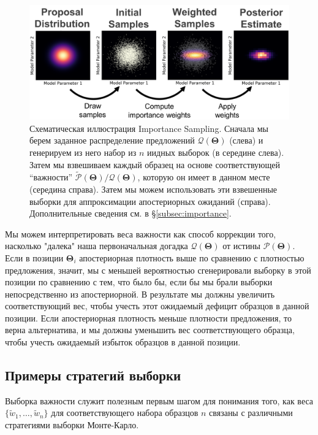 \documentclass[12pt, titlepage]{article}
\newcommand{\params}{\ensuremath{\boldsymbol\Theta}}
\newcommand{\posterior}{\ensuremath{\mathcal{P}}}
\newcommand{\proposal}{\ensuremath{\mathcal{Q}}}
\begin{document}
\begin{figure}
\begin{center}
\includegraphics[width=\textwidth]{figures/fig7.png}
\end{center}
\caption{Схематическая иллюстрация Importance Sampling. Сначала мы берем заданное распределение предложений $\proposal(\params)$ (слева) и генерируем из него набор из $n$ иидных выборок (в середине слева). Затем мы взвешиваем каждый образец на основе соответствующей ``важности'' $\tilde{\posterior}(\params)/\proposal(\params)$, которую он имеет в данном месте (середина справа). Затем мы можем использовать эти взвешенные выборки для аппроксимации апостериорных ожиданий (справа). Дополнительные сведения см. в \S\ref{subsec:importance}.
}\label{fig:importance}
\end{figure}

Мы можем интерпретировать веса важности как способ коррекции того, насколько "далека" наша первоначальная догадка $\proposal(\params)$ от истины $\posterior(\params)$. Если в позиции $\params_i$ апостериорная плотность выше по сравнению с плотностью предложения, значит, мы с меньшей вероятностью сгенерировали выборку в этой позиции по сравнению с тем, что было бы, если бы мы брали выборки непосредственно из апостериорной. В результате мы должны увеличить соответствующий вес, чтобы учесть этот ожидаемый дефицит образцов в данной позиции. Если апостериорная плотность меньше плотности предложения, то верна альтернатива, и мы должны уменьшить вес соответствующего образца, чтобы учесть ожидаемый избыток образцов в данной позиции.

\subsection{Примеры стратегий выборки} \label{subsection:samp_strat}

Выборка важности служит полезным первым шагом для понимания того, как веса $\{ \tilde{w}_1, \dots, \tilde{w}_n \}$ для соответствующего набора образцов $n$ связаны с различными стратегиями выборки Монте-Карло.
\end{document}
